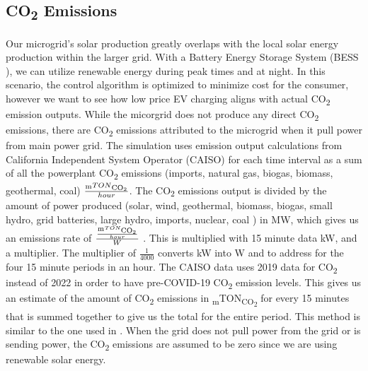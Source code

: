\documentclass[conference]{IEEEtran}
\begin{document}
    \subsection{CO\textsubscript{2} Emissions}
        	Our microgrid's solar production greatly overlaps with the local solar energy production within the larger grid.  With a Battery Energy Storage System (BESS ), we can utilize renewable energy during peak times and at night. In this scenario, the control algorithm is optimized to minimize cost for the consumer, however we want to see how low price EV charging aligns with actual CO\textsubscript{2} emission outputs.  While the micorgrid does not produce any direct CO\textsubscript{2} emissions, there are CO\textsubscript{2} emissions attributed to the microgrid when it pull power from main power grid.  The simulation uses emission output calculations from California Independent System Operator (CAISO) for each time interval as a sum of all the powerplant CO\textsubscript{2} emissions (imports, natural gas, biogas, biomass, geothermal, coal) $\frac{\textsubscript{m}TON\textsubscript{CO\textsubscript{2}}}{hour}$. The CO\textsubscript{2} emissions output is divided by the amount of power produced (solar, wind, geothermal, biomass, biogas, small hydro, grid batteries, large hydro, imports, nuclear, coal ) in MW, which gives us an emissions rate of $\frac{\frac{\textsubscript{m}TON\textsubscript{CO\textsubscript{2}}}{hour}}{W}$ . This is multiplied with 15 minute data kW, and a multiplier. The multiplier of  $\frac{1}{4000}$ converts kW into W and to address for the four 15 minute periods in an hour.  The CAISO data uses 2019 data for CO\textsubscript{2} instead of 2022 in order to have pre-COVID-19 CO\textsubscript{2} emission levels. This gives us an estimate of the amount of CO\textsubscript{2} emissions in \textsubscript{m}TON\textsubscript{CO\textsubscript{2}} for every 15 minutes that is summed together to give us the total for the entire period.  This method is similar to the one used in \cite{garrido2021dynamic}.  When the grid does not pull power from the grid or is sending power, the CO\textsubscript{2} emissions are assumed to be zero since we are using renewable solar energy.
\end{document}
